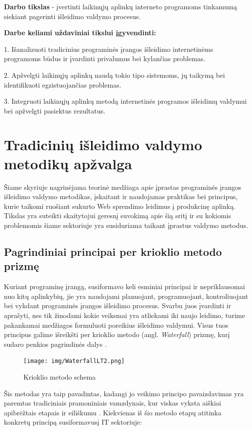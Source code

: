\documentclass{VUMIFPSkursinis}
\begin{document}
\bigskip

\textbf{Darbo tikslas} - įvertinti laikinųjų aplinkų interneto programoms tinkamumą siekiant pagerinti išleidimo valdymo procesus. 

\textbf{Darbe keliami uždaviniai tikslui įgyvendinti:}

1. Išanalizuoti tradicinius programinės įrangos išleidimo internetinėms programoms būdus ir įvardinti privalumus bei kylančias problemas.

2. Apžvelgti laikinųjų aplinkų naudą tokio tipo sistemoms, jų taikymą bei identifikuoti egzistuojančias problemas.

3. Integruoti laikinųjų aplinkų metodą internetinės programos išleidimų valdymui bei apžvelgti pasiektus rezultatus.

\section{Tradicinių išleidimo valdymo metodikų apžvalga}
Šiame skyriuje nagrinėjama teorinė medžiaga apie įprastas programinės įrangos išleidimo valdymo metodikas, įskaitant ir naudojamas praktikas bei principus, kurie taikomi ruošiant sukurto Web sprendimo leidimus į produkcinę aplinką. Tikslas yra suteikti skaitytojui geresnį suvokimą apie šią sritį ir su kokiomis problemomis šiame sektoriuje yra susiduriama taikant įprastus valdymo metodus.

\subsection{Pagrindiniai principai per krioklio metodo prizmę}
Kuriant programinę įrangą, susiformavo keli esminiai principai ir nepriklausomai nuo kitų aplinkybių, jie yra naudojami planuojant, programuojant, kontroliuojant bei vykdant programinės įrangos išleidimo procesus. Svarbu juos įvardinti ir aprašyti, nes tik žinodami kokie veiksmai yra atliekami iki naujo leidimo, turime pakankamai medžiagos formuluoti poreikius išleidimo valdymui. Visus tuos principus galime išreikšti per krioklio metodo (angl. \textit{Waterfall}) prizmę, kurį sudaro penkios pagrindinės dalys \cite{SaltTrecias}.

\begin{figure}[H]
    \centering
    \texttt{[image: img/WaterfallLT2.png]}
    \caption{Krioklio metodo schema}
    \label{img:mlp}
\end{figure}

Šis metodas yra taip pavadintas, kadangi jo veikimo principo pavaizdavimas yra paremtas tradiciniais pramoniniais vamzdynais, kur viskas vyksta aiškiai apibrėžtais etapais ir eiliškumu \cite{SaltTrecias}. Kiekvienas iš šio metodo etapų atitinka konkretų principą susiformavusį IT sektoriuje:
\end{document}
